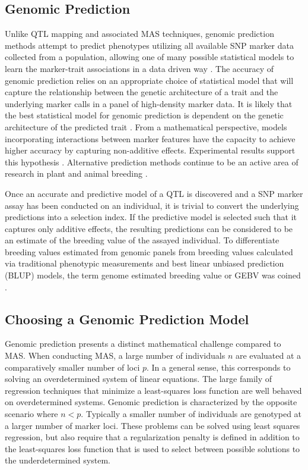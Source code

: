 \subsection*{Genomic Prediction}

Unlike QTL mapping and associated MAS techniques, genomic prediction methods 
attempt to predict phenotypes utilizing all available SNP marker data collected 
from a population, allowing one of many possible statistical models to learn 
the marker-trait associations in a data driven way \citep{meuwissen2001}. 
The accuracy of genomic prediction relies on an appropriate choice of statistical model that 
will capture the relationship between the genetic architecture
of a trait and the underlying marker calls in a panel of high-density marker 
data. It is likely that the best statistical model for genomic prediction is 
dependent on the genetic architecture of 
the predicted trait \citep{crossa2010, gonzalez-camacho2012, 
resende2012, cleveland2012, thavamanikumar2015}.  From a mathematical perspective,
models incorporating interactions between marker features have the 
capacity to achieve higher accuracy by capturing non-additive effects.
Experimental results support this hypothesis \citep{gonzalez-camacho2012}. 
Alternative prediction methods continue to be an active area of research 
in plant and animal breeding \citep{koning2012}.

Once an accurate and predictive model of a QTL is discovered and a SNP marker
assay has been conducted on an individual, it is trivial to convert the underlying
predictions into a selection index. If the predictive model is selected 
such that it captures only additive effects, the resulting predictions can be 
considered to be an estimate of the breeding value of the assayed individual.
To differentiate breeding values estimated from genomic panels from breeding values
calculated via traditional phenotypic measurements and best linear unbiased prediction (BLUP)
models, the term genome estimated breeding value or GEBV was coined \citep{meuwissen2001}.

\subsection*{Choosing a Genomic Prediction Model}

Genomic prediction presents a distinct mathematical challenge compared to MAS.
When conducting MAS, a large number of individuals $n$ are evaluated at a
comparatively smaller number of loci $p$. In a general sense, this corresponds 
to solving an overdetermined system of linear equations. The large family of 
regression techniques that minimize a least-squares loss function are well
behaved on overdetermined systems. Genomic prediction is characterized by the opposite
scenario where $n < p$. Typically a smaller number of individuals are genotyped
at a larger number of marker loci. These problems can be solved using least squares regression,
but also require that a regularization penalty is defined in addition to the least-squares 
loss function that is used to select between possible solutions to the underdetermined
system. 

